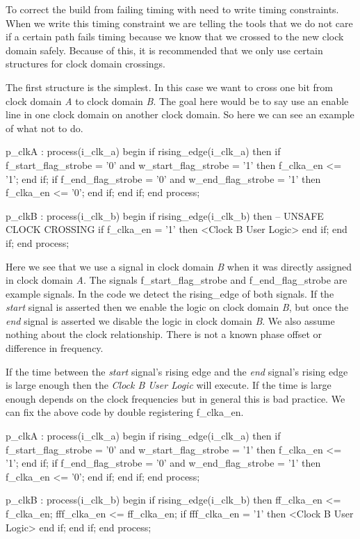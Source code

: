 To correct the build from failing timing with need to write timing constraints. When we write this timing constraint we are telling the tools that we do not care if a certain path fails timing because we know that we crossed to the new clock domain safely. Because of this, it is recommended that we only use certain structures for clock domain crossings. 
	
The first structure is the simplest. In this case we want to cross one bit from clock domain \emph{A} to clock domain \emph{B}. The goal here would be to say use an enable line in one clock domain on another clock domain. So here we can see an example of what not to do. 

\begin{VHDLlisting}[tabsize=4]
p_clkA : process(i_clk_a)
begin
    if rising_edge(i_clk_a) then
        if f_start_flag_strobe = '0' and w_start_flag_strobe = '1' then
            f_clka_en <= '1';
        end if;
        if f_end_flag_strobe = '0' and w_end_flag_strobe = '1' then
            f_clka_en <= '0';
        end if;
    end if;
end process;

p_clkB : process(i_clk_b)
begin
    if rising_edge(i_clk_b) then
        -- UNSAFE CLOCK CROSSING
        if f_clka_en = '1' then
            <Clock B User Logic>
        end if;
    end if;
end process;
\end{VHDLlisting}	
	
Here we see that we use a signal in clock domain \emph{B} when it was directly assigned in clock domain \emph{A}. The signals f\_start\_flag\_strobe and f\_end\_flag\_strobe are example signals. In the code we detect the rising\_edge of both signals. If the \emph{start} signal is asserted then we enable the logic on clock domain \emph{B}, but once the \emph{end} signal is asserted we disable the logic in clock domain \emph{B}. We also assume nothing about the clock relationship. There is not a known phase offset or difference in frequency. 

If the time between the \emph{start} signal's rising edge and the \emph{end} signal's rising edge is large enough then the \emph{Clock B User Logic} will execute. If the time is large enough depends on the clock frequencies but in general this is bad practice. We can fix the above code by double registering f\_clka\_en. 

\begin{VHDLlisting}[tabsize=4]
p_clkA : process(i_clk_a)
begin
    if rising_edge(i_clk_a) then
        if f_start_flag_strobe = '0' and w_start_flag_strobe = '1' then
            f_clka_en <= '1';
        end if;
        if f_end_flag_strobe = '0' and w_end_flag_strobe = '1' then
            f_clka_en <= '0';
        end if;
    end if;
end process;

p_clkB : process(i_clk_b)
begin
    if rising_edge(i_clk_b) then
        ff_clka_en <= f_clka_en;
        fff_clka_en <= ff_clka_en;
        if fff_clka_en = '1' then
            <Clock B User Logic>
        end if;
    end if;
end process;
\end{VHDLlisting}	

